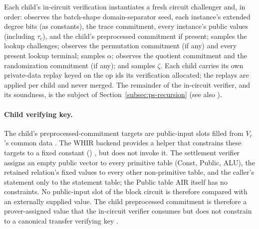 Each child's in-circuit verification instantiates a fresh circuit challenger and,
in order: observes the batch-shape domain-separator seed, each instance's extended
degree bits (as constants), the trace commitment, every instance's public values
(including $\tau_c$), and the child's preprocessed commitment if present; samples
the lookup challenges; observes the permutation commitment (if any) and every
present lookup terminal; samples $\alpha$; observes the quotient commitment and
the randomization commitment (if any); and samples $\zeta$.
Each child carries its own private-data replay keyed on the op ids its
verification allocated; the replays are applied per child and never merged.
The remainder of the in-circuit verifier, and its soundness, is the subject of
Section~\ref{subsec:ps-recursion} (see also ).

\paragraph{Child verifying key.}
The child's preprocessed-commitment targets are public-input slots filled from
$V_c$'s common data . The WHIR backend
provides a helper that constrains these targets to a fixed constant
()
, but
 does not invoke it. The settlement
verifier assigns an empty public vector to every primitive table (Const,
Public, ALU), the retained relation's fixed values to every other non-primitive
table, and the caller's statement only to the statement table; the Public table
AIR itself has no constraints. No public-input slot of the block circuit is
therefore compared with an externally supplied value.
The child preprocessed commitment is therefore a prover-assigned value that the
in-circuit verifier consumes but does not constrain to a canonical transfer
verifying key .

